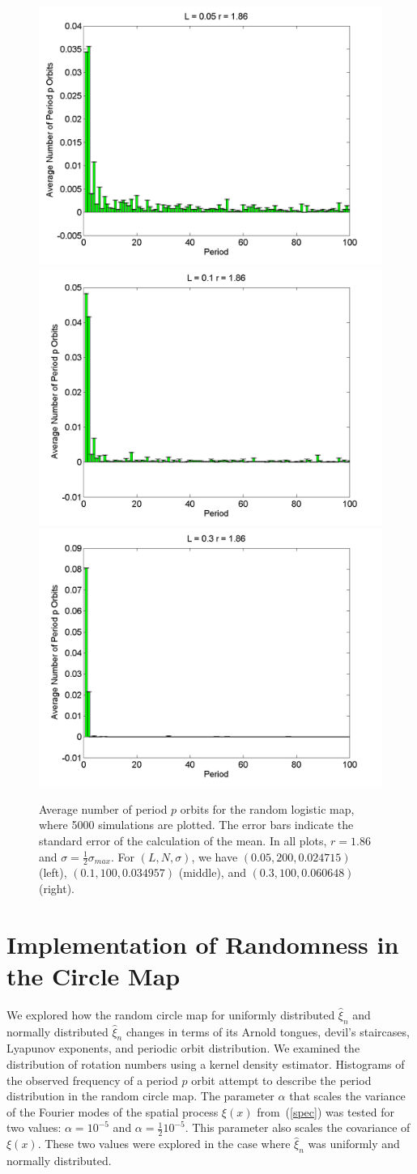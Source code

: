 \begin{figure}[H]\linespread{1}
\caption[Average number of period $p$ orbits for the random logistic
map, $\sigma=\frac{1}{2}\sigma_{max}$ and $r=1.86$]{Average number of period $p$ orbits for the random logistic
map, where 5000 simulations are plotted. The error bars indicate
the standard error of the calculation of the mean. In all plots,
$r=1.86$ and $\sigma=\frac{1}{2}\sigma_{max}$. For $(L,N,\sigma)$,
we have $(0.05, 200, 0.024715)$ (left), $(0.1, 100, 0.034957)$
(middle), and $(0.3, 100, 0.060648)$ (right).}\label{fig:rloghist2_hs}
	\begin{center}	\includegraphics[width=.33\textwidth]{figs/rlog_hist_hs_L_005_r_186_s_0024715_a_15267e-05_sims_5000.png}\hfill
\includegraphics[width=.33\textwidth]{figs/rlog_hist_hs_L_01_r_186_s_0034957_a_6105e-05_sims_5000.png}\hfill	
\includegraphics[width=.33\textwidth]{figs/rlog_hist_hs_L_03_r_186_s_0060648_a_000054762_sims_5000.png}
	\end{center}
\end{figure}

\section{Implementation of Randomness in the Circle Map}
We explored how the random circle map for uniformly distributed $\hat{\xi}_n$ and
normally distributed $\hat{\xi}_n$ changes in terms of its Arnold
tongues, devil's staircases, Lyapunov exponents, and periodic orbit distribution. We examined the
distribution of rotation numbers using a kernel density
estimator. Histograms of the observed frequency of a period $p$ orbit
attempt to describe the period distribution in the random circle
map. The parameter $\alpha$ that scales the variance of the Fourier
modes of the spatial process $\xi(x)$ from~(\ref{spec}) was tested for two values: $\alpha=10^{-5}$
and $\alpha = \frac{1}{2}10^{-5}$. This parameter also scales the
covariance of $\xi(x)$. These two values were explored in
the case where $\hat{\xi}_n$ was uniformly and normally distributed.

